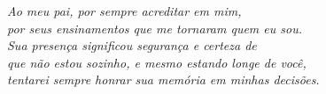 \begin{dedicatoria}
   \vspace*{\fill}
   \centering
   \noindent
   \textit{ Ao meu pai, por sempre acreditar em mim,\\
    por seus ensinamentos que me tornaram quem eu sou.\\
    Sua presença significou segurança e certeza de\\
    que não estou sozinho, e mesmo estando longe de você, \\
    tentarei sempre honrar sua memória em minhas decisões.} \vspace*{\fill}
\end{dedicatoria}